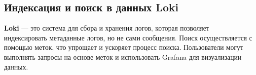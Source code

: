 \subsection*{Индексация и поиск в данных Loki}

\textbf{Loki} --- это система для сбора и хранения логов,
которая позволяет индексировать метаданные логов, но не сами сообщения.
Поиск осуществляется с помощью меток, что упрощает и ускоряет процесс поиска.
Пользователи могут выполнять запросы на основе меток
и использовать Grafana для визуализации данных.

